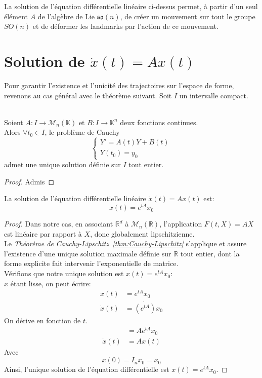 \documentclass[12pt]{report}
\begin{document}
\begin{remark}
La solution de l'équation différentielle linéaire ci-dessus permet, à partir d'un seul élément $A$ de l'algèbre de Lie $\mathfrak{so}(n)$, de créer un mouvement sur tout le groupe $SO(n)$ et de déformer les landmarks par l'action de ce mouvement.
\end{remark}

\section{Solution de \texorpdfstring{$\dot{x}(t)=Ax(t)$}{x.\ (t)=Ax (t)}}

Pour garantir l'existence et l'unicité des trajectoires sur l'espace de forme, revenons au cas général avec le théorème suivant. Soit $I$ un intervalle compact.

\begin{theorem} \label{thm:Cauchy-Lipschitz}\leavevmode\\
Soient $A\colon I\rightarrow\mathcal{M}_n(\mathbb{K})$ et $B\colon I\rightarrow\mathbb{K}^n$ deux fonctions continues.\\
Alors $\forall t_0\in I$, le problème de Cauchy
\[
\left\{\begin{array}{ll}Y'=A(t)Y+B(t)\\ Y(t_0)=y_0\end{array}\right.
\]
admet une unique solution définie sur $I$ tout entier.
\end{theorem}

\begin{proof}
Admis
\end{proof}

\begin{proposition}\label{prop:solution-equadiff}
La solution de l'équation différentielle linéaire $\dot{x}(t)=Ax(t)$ est:
\[
x(t)=e^{tA}x_0
\]
\end{proposition}

\begin{proof}
Dans notre cas, en associant $\mathbb{R}^d$ à $\mathcal{M}_n(\mathbb{R})$, l'application $F(t,X) = AX$ est linéaire par rapport à $X$, donc globalement lipschitzienne.\\
Le \textit{Théorème de Cauchy-Lipschitz~\ref{thm:Cauchy-Lipschitz}} s'applique et assure l'existence d'une unique solution maximale définie sur $\mathbb{R}$ tout entier, dont la forme explicite fait intervenir l'exponentielle de matrice.\\
Vérifions que notre unique solution est $x(t)=e^{tA}x_0$:\\
$x$ étant lisse, on peut écrire:
\[
\begin{aligned}
x(t)&=e^{tA}x_0\\
\dot{x}(t)&=\dot{(e^{tA})}x_0
\end{aligned}
\]
On dérive en fonction de $t$.
\[
\begin{aligned}
&= Ae^{tA}x_0\\
\dot{x}(t)&=Ax(t)
\end{aligned}
\]
Avec
\[
x(0)=I_{n}x_0=x_0
\]
Ainsi, l'unique solution de l'équation différentielle est \underline{$x(t)=e^{tA}x_0$}.
\end{proof}
\end{document}
